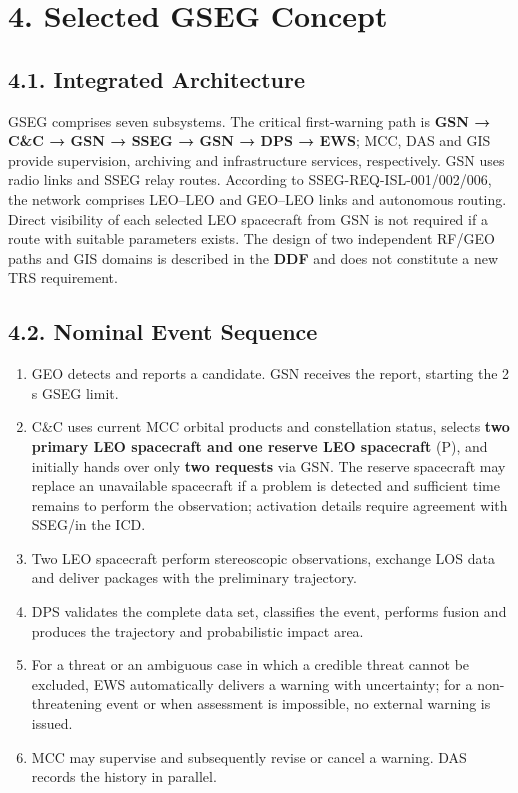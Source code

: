 \section{4. Selected GSEG Concept}\label{selected-concept-and-product-presentation}

\subsection{4.1. Integrated Architecture}\label{integrated-gseg-architecture}

GSEG comprises seven subsystems. The critical first-warning path is \textbf{GSN → C\&C → GSN → SSEG → GSN → DPS → EWS}; MCC, DAS and GIS provide supervision, archiving and infrastructure services, respectively. GSN uses radio links and SSEG relay routes. According to SSEG-REQ-ISL-001/\allowbreak{}002/\allowbreak{}006, the network comprises LEO–LEO and GEO–LEO links and autonomous routing. Direct visibility of each selected LEO spacecraft from GSN is not required if a route with suitable parameters exists. The design of two independent RF/\allowbreak{}GEO paths and GIS domains is described in the \textbf{DDF} and does not constitute a new TRS requirement.

\subsection{4.2. Nominal Event Sequence}\label{nominal-event-handling-sequence}

\begin{enumerate}
\item GEO detects and reports a candidate. GSN receives the report, starting the 2 s GSEG limit.
\item C\&C uses current MCC orbital products and constellation status, selects \textbf{two primary LEO spacecraft and one reserve LEO spacecraft} (P), and initially hands over only \textbf{two requests} via GSN. The reserve spacecraft may replace an unavailable spacecraft if a problem is detected and sufficient time remains to perform the observation; activation details require agreement with SSEG/\allowbreak{}in the ICD.
\item Two LEO spacecraft perform stereoscopic observations, exchange LOS data and deliver packages with the preliminary trajectory.
\item DPS validates the complete data set, classifies the event, performs fusion and produces the trajectory and probabilistic impact area.
\item For a threat or an ambiguous case in which a credible threat cannot be excluded, EWS automatically delivers a warning with uncertainty; for a non-threatening event or when assessment is impossible, no external warning is issued.
\item MCC may supervise and subsequently revise or cancel a warning. DAS records the history in parallel.
\end{enumerate}

